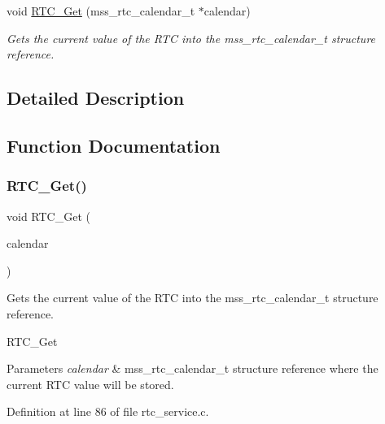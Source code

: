 \begin{DoxyCompactItemize}
void \hyperlink{group___r_t_c___service_ga3fbf86f372b02641ca67d03c2196b805}{R\+T\+C\+\_\+\+Get} (mss\+\_\+rtc\+\_\+calendar\+\_\+t $\ast$calendar)
\begin{DoxyCompactList}\small\item\em Gets the current value of the R\+TC into the mss\+\_\+rtc\+\_\+calendar\+\_\+t structure reference. \end{DoxyCompactList}\end{DoxyCompactItemize}


\subsection{Detailed Description}


\subsection{Function Documentation}
\mbox{\label{group___r_t_c___service_ga3fbf86f372b02641ca67d03c2196b805}} 
\subsubsection{\texorpdfstring{R\+T\+C\+\_\+\+Get()}{RTC\_Get()}}
{\footnotesize\ttfamily void R\+T\+C\+\_\+\+Get (\begin{DoxyParamCaption}\item[{mss\+\_\+rtc\+\_\+calendar\+\_\+t $\ast$}]{calendar }\end{DoxyParamCaption})}



Gets the current value of the R\+TC into the mss\+\_\+rtc\+\_\+calendar\+\_\+t structure reference. 

R\+T\+C\+\_\+\+Get


\begin{DoxyParams}{Parameters}
{\em calendar} & mss\+\_\+rtc\+\_\+calendar\+\_\+t structure reference where the current R\+TC value will be stored. \\
\hline
\end{DoxyParams}


Definition at line 86 of file rtc\+\_\+service.\+c.

\mbox{\label{group___r_t_c___service_gaffc3970d07652e14bc2d1f0de4582bca}} 
